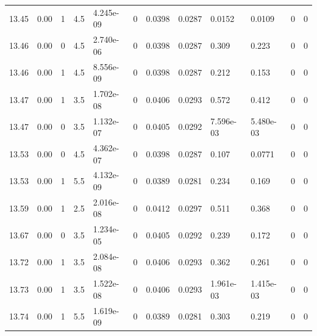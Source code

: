 \documentclass[preview]{standalone}
\begin{document}
{{{{{{{{{\begin{tabular}{L{1.2cm}C{1.2cm} C{0.3cm}C{0.5cm} C{1.4cm}C{1.4cm} C{1.4cm}C{1.4cm} C{1.6cm}C{1.6cm} C{1.6cm}C{1.6cm}}
  13.45  &  0.00  & 1     & 4.5 &  4.245e-09  & 0  &  0.0398&   0.0287& 0.0152 & 0.0109   &  0 & 0  \\ 
  13.46  &  0.00  & 0     & 4.5 &  2.740e-06  & 0  &  0.0398&   0.0287& 0.309 & 0.223   &  0 & 0  \\ 
  13.46  &  0.00  & 1     & 4.5 &  8.556e-09  & 0  &  0.0398&   0.0287& 0.212 & 0.153   &  0 & 0  \\ 
  13.47  &  0.00  & 1     & 3.5 &  1.702e-08  & 0  &  0.0406&   0.0293& 0.572 & 0.412   &  0 & 0  \\ 
  13.47  &  0.00  & 0     & 3.5 &  1.132e-07  & 0  &  0.0405&   0.0292& 7.596e-03 & 5.480e-03   &  0 & 0  \\ 
  13.53  &  0.00  & 0     & 4.5 &  4.362e-07  & 0  &  0.0398&   0.0287& 0.107 & 0.0771   &  0 & 0  \\ 
  13.53  &  0.00  & 1     & 5.5 &  4.132e-09  & 0  &  0.0389&   0.0281& 0.234 & 0.169   &  0 & 0  \\ 
  13.59  &  0.00  & 1     & 2.5 &  2.016e-08  & 0  &  0.0412&   0.0297& 0.511 & 0.368   &  0 & 0  \\ 
  13.67  &  0.00  & 0     & 3.5 &  1.234e-05  & 0  &  0.0405&   0.0292& 0.239 & 0.172   &  0 & 0  \\ 
  13.72  &  0.00  & 1     & 3.5 &  2.084e-08  & 0  &  0.0406&   0.0293& 0.362 & 0.261   &  0 & 0  \\ 
  13.73  &  0.00  & 1     & 3.5 &  1.522e-08  & 0  &  0.0406&   0.0293& 1.961e-03 & 1.415e-03   &  0 & 0  \\ 
  13.74  &  0.00  & 1     & 5.5 &  1.619e-09  & 0  &  0.0389&   0.0281& 0.303 & 0.219   &  0 & 0  \\ 
\hline 
\end{tabular} 

}}}}}}}}}
\end{document}

